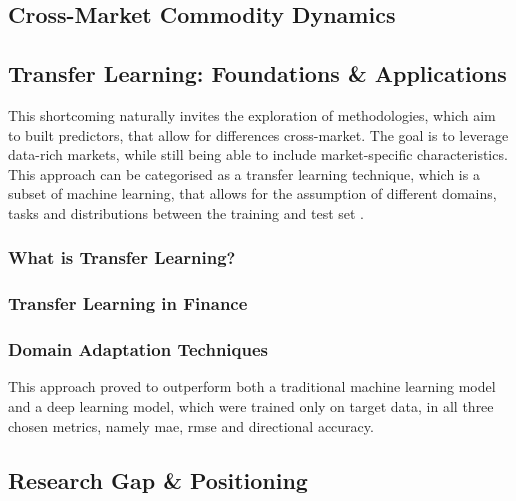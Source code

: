 \subsection{Cross-Market Commodity Dynamics}


\subsection{Transfer Learning: Foundations \& Applications} \label{subsec: literature_transfer learning}
This shortcoming naturally invites the exploration of methodologies, which aim to built predictors, that allow for differences cross-market. The goal is to leverage data-rich markets, while still being able to include market-specific characteristics. This approach can be categorised as a transfer learning technique, which is a subset of machine learning, that allows for the assumption of different domains, tasks and distributions between the training and test set \parencite{panSurveyTransferLearning2010}.
\subsubsection{What is Transfer Learning?}
\subsubsection{Transfer Learning in Finance}
\subsubsection{Domain Adaptation Techniques}
\textcite{mashettyTransferLearningCrossMarket2025a}  This approach proved to outperform both a traditional machine learning model and a deep learning model, which were trained only on target data, in all three chosen metrics, namely \ac{mae}, \ac{rmse} and directional accuracy.

\subsection{Research Gap \& Positioning}    \label{subsec: literature_research gap}
